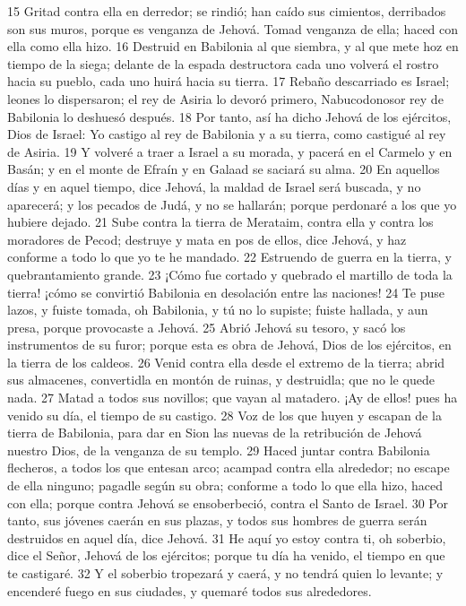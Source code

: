 15 Gritad contra ella en derredor; se rindió; han caído sus cimientos, derribados son sus muros, porque es venganza de Jehová. Tomad venganza de ella; haced con ella como ella hizo.
16 Destruid en Babilonia al que siembra, y al que mete hoz en tiempo de la siega; delante de la espada destructora cada uno volverá el rostro hacia su pueblo, cada uno huirá hacia su tierra.
17 Rebaño descarriado es Israel; leones lo dispersaron; el rey de Asiria lo devoró primero, Nabucodonosor rey de Babilonia lo deshuesó después.
18 Por tanto, así ha dicho Jehová de los ejércitos, Dios de Israel: Yo castigo al rey de Babilonia y a su tierra, como castigué al rey de Asiria.
19 Y volveré a traer a Israel a su morada, y pacerá en el Carmelo y en Basán; y en el monte de Efraín y en Galaad se saciará su alma.
20 En aquellos días y en aquel tiempo, dice Jehová, la maldad de Israel será buscada, y no aparecerá; y los pecados de Judá, y no se hallarán; porque perdonaré a los que yo hubiere dejado.
21 Sube contra la tierra de Merataim, contra ella y contra los moradores de Pecod; destruye y mata en pos de ellos, dice Jehová, y haz conforme a todo lo que yo te he mandado.
22 Estruendo de guerra en la tierra, y quebrantamiento grande.
23 ¡Cómo fue cortado y quebrado el martillo de toda la tierra! ¡cómo se convirtió Babilonia en desolación entre las naciones!
24 Te puse lazos, y fuiste tomada, oh Babilonia, y tú no lo supiste; fuiste hallada, y aun presa, porque provocaste a Jehová.
25 Abrió Jehová su tesoro, y sacó los instrumentos de su furor; porque esta es obra de Jehová, Dios de los ejércitos, en la tierra de los caldeos.
26 Venid contra ella desde el extremo de la tierra; abrid sus almacenes, convertidla en montón de ruinas, y destruidla; que no le quede nada.
27 Matad a todos sus novillos; que vayan al matadero. ¡Ay de ellos! pues ha venido su día, el tiempo de su castigo.
28 Voz de los que huyen y escapan de la tierra de Babilonia, para dar en Sion las nuevas de la retribución de Jehová nuestro Dios, de la venganza de su templo.
29 Haced juntar contra Babilonia flecheros, a todos los que entesan arco; acampad contra ella alrededor; no escape de ella ninguno; pagadle según su obra; conforme a todo lo que ella hizo, haced con ella; porque contra Jehová se ensoberbeció, contra el Santo de Israel.
30 Por tanto, sus jóvenes caerán en sus plazas, y todos sus hombres de guerra serán destruidos en aquel día, dice Jehová.
31 He aquí yo estoy contra ti, oh soberbio, dice el Señor, Jehová de los ejércitos; porque tu día ha venido, el tiempo en que te castigaré.
32 Y el soberbio tropezará y caerá, y no tendrá quien lo levante; y encenderé fuego en sus ciudades, y quemaré todos sus alrededores.
